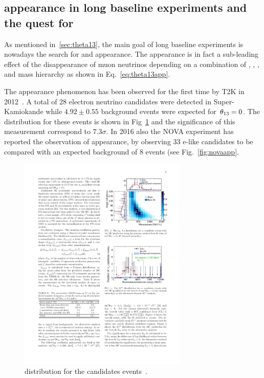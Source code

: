 \subsection{\nue appearance in long baseline experiments and the quest for \dcp}
As mentioned in~\ref{sec:theta13}, the main goal of long baseline experiments is nowadays the search for \nue and \nueb appearance. The \nue appearance is in fact a sub-leading effect of the disappearance of muon neutrinos depending on a combination of \thint, \thatm, \dcp, and mass hierarchy as shown in Eq.~\ref{eq:theta13app}.

The \nue appearance phenomenon has been observed for the first time by T2K in 2012~\cite{Abe:2013hdq}. A total of 28 electron neutrino candidates were detected in Super-Kamiokande while $4.92\pm0.55$ background events were expected for $\textrm \,\theta_{13}=0$. The \ptheta distribution for these events is shown in Fig~\ref{fig:t2kapp} and the significance of this measurement correspond to $7.3\sigma$. In 2016 also the NOVA experiment has reported the observation of \nue appearance, by observing 33 e-like candidates to be compared with an expected background of 8 events (see Fig.~\ref{fig:novaapp}.

\begin{figure} [h!]
\begin{center}
\includegraphics[width=8cm]{figures/nueapp_ptheta.pdf}
\caption{\label{fig:t2kapp} \ptheta distribution for the \nue candidates events~\cite{Abe:2013hdq}.}
\end{center}
\end{figure}

